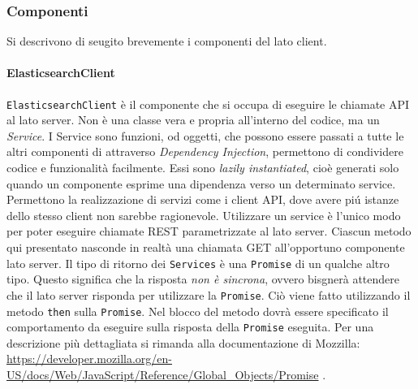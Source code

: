 \subsubsection{Componenti} 
\label{sec:Componenti}
Si descrivono di seugito brevemente i componenti del lato client.

\paragraph{ElasticsearchClient} \Spazio
\label{sec:elasticsearchClient}
\texttt{ElasticsearchClient} è il componente che si occupa di eseguire le chiamate API al lato server. Non è una classe vera e propria all'interno del codice, ma un \emph{Service}. 
I Service sono funzioni, od oggetti, che possono essere passati a tutte le altri componenti di  attraverso \emph{Dependency Injection}, permettono di condividere codice e funzionalità facilmente. Essi sono \emph{lazily instantiated}, cioè generati solo quando un componente esprime una dipendenza verso un determinato service. Permettono la realizzazione di servizi come i client API, dove avere piú istanze dello stesso client non sarebbe ragionevole. 
Utilizzare un service è l'unico modo per poter eseguire chiamate REST parametrizzate al lato server. Ciascun metodo qui presentato nasconde in realtà una chiamata GET all'opportuno componente lato server. 
Il tipo di ritorno dei \texttt{Services} è una \texttt{Promise} di un qualche altro tipo. Questo significa che la risposta \emph{non è sincrona}, ovvero bisgnerà attendere che il lato server risponda per utilizzare la \texttt{Promise}. Ciò viene fatto utilizzando il metodo \texttt{then} sulla \texttt{Promise}. Nel blocco del metodo dovrà essere specificato il comportamento da eseguire sulla risposta della \texttt{Promise} eseguita. Per una descrizione più dettagliata si rimanda alla documentazione di Mozzilla: \href{https://developer.mozilla.org/en-US/docs/Web/JavaScript/Reference/Global\_Objects/Promise}{https://developer.mozilla.org/en-US/docs/Web/JavaScript/Reference/Global\_Objects/Promise} .

